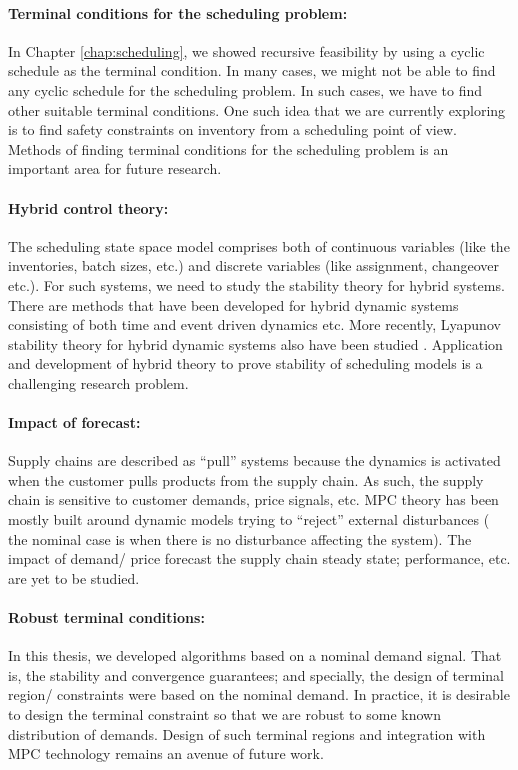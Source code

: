 \paragraph{Terminal conditions for the scheduling problem:}
In Chapter \ref{chap:scheduling}, we showed recursive feasibility by
using a cyclic schedule as the terminal condition. In many cases, we
might not be able to find any cyclic schedule for the scheduling
problem. In such cases, we have to find other suitable terminal
conditions. One such idea that we are currently exploring is to find
safety constraints on inventory from a scheduling point of view.
Methods of finding terminal conditions for the scheduling problem is
an important area for future research.
\paragraph{Hybrid control theory:}
The scheduling state space model comprises both of continuous
variables (like the inventories, batch sizes, etc.) and discrete variables
(like assignment, changeover etc.). For such systems, we need to study
the stability theory for hybrid systems. There are methods that have
been developed for hybrid dynamic systems consisting of both time and
event driven dynamics \citep{bemporad:morari:1999,
  morari:baotic:borrelli:2003} etc. More recently, Lyapunov stability
theory for hybrid dynamic systems also have been studied
\citep{lazar:heemels:2009,lazar:heemels:teel:2009}. Application and
development  of hybrid theory to prove stability of scheduling models
is a challenging research problem.
\paragraph{Impact of forecast:}
Supply chains are described as ``pull'' systems because the  dynamics
is activated when the customer pulls products from the 
supply chain. As such, the supply chain is sensitive to customer
demands, price signals, etc. MPC theory has been mostly built around
dynamic models trying to ``reject'' external disturbances ( \eg the
nominal case is when there is no disturbance affecting the
system). The impact of demand/ price forecast 
the supply chain steady state; performance, etc. are yet to be studied. 
\paragraph{ Robust terminal conditions:}
In this thesis, we developed  algorithms based on a nominal demand
signal. That is, the stability and convergence guarantees; and
specially, the design of terminal
region/ constraints were based on the nominal demand. In practice, it
is desirable to design the terminal constraint so that we are robust
to some known distribution of demands. Design of such terminal regions
and integration with MPC technology remains an avenue of future work. 
